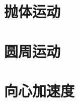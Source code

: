 \documentclass[color=purple,openany]{textbook-cn}
\begin{document}
\begin{Link}
\zhlipsum[1]
\end{Link}


\section{抛体运动}
\begin{Point}
\lipsum[2]
\end{Point}

\begin{Case}
\item \lipsum[1][3]
\item \lipsum[1][3]
\item \lipsum[1][3]
\item \lipsum[1][3]
\end{Case}

\begin{Link}
\zhlipsum[1]
\end{Link}




\section{圆周运动}
\begin{Point}
\lipsum[2]
\end{Point}

\begin{Case}
\item \lipsum[1][3]
\item \lipsum[1][3]
\item \lipsum[1][3]
\item \lipsum[1][3]
\end{Case}

\begin{Link}
\zhlipsum[1]
\end{Link}




\section{向心加速度}
\begin{Point}
\lipsum[2]
\end{Point}

\begin{Case}
\item \lipsum[1][3]
\item \lipsum[1][3]
\item \lipsum[1][3]
\item \lipsum[1][3]
\end{Case}
\end{document}
